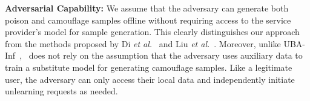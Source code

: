 \vspace{0.15cm}
\noindent \textbf{Adversarial Capability:} We assume that the adversary can generate both poison and camouflage samples offline without requiring access to the service provider's model for sample generation. This clearly distinguishes our approach from the methods proposed by Di \textit{et al.}~\cite{DBLP:conf/nips/DiDA0S23} and Liu \textit{et al.}~\cite{DBLP:conf/aaai/LiuWHM24}. Moreover, unlike UBA-Inf~\cite{uba}, \methodname~does not rely on the assumption that the adversary uses auxiliary data to train a substitute model for generating camouflage samples. Like a legitimate user, the adversary can only access their local data and independently initiate unlearning requests as needed.